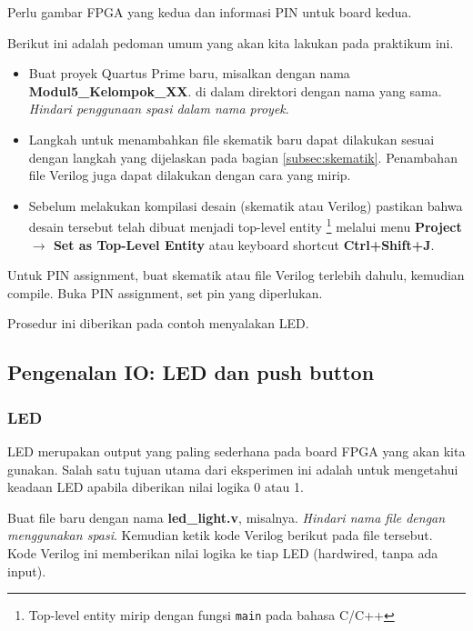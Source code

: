 \documentclass[a4paper,12pt,bahasa]{extarticle}
\begin{document}
{\color{red}Perlu gambar FPGA yang kedua dan informasi PIN untuk board kedua.}

Berikut ini adalah pedoman umum yang akan kita lakukan pada praktikum ini.

\begin{itemize}

\item Buat proyek Quartus Prime baru, misalkan dengan nama \textbf{Modul5\_Kelompok\_XX}.
di dalam direktori dengan nama yang sama. \textit{Hindari penggunaan
spasi dalam nama proyek}.

\item Langkah untuk menambahkan file skematik baru dapat dilakukan sesuai dengan langkah yang
dijelaskan pada bagian \ref{subsec:skematik}. Penambahan file Verilog
juga dapat dilakukan dengan cara yang mirip.

\item Sebelum melakukan kompilasi desain (skematik atau Verilog)
pastikan bahwa desain tersebut telah dibuat menjadi top-level entity
\footnote{Top-level entity mirip dengan fungsi \texttt{main} pada bahasa C/C++}
melalui menu \textbf{Project $\rightarrow$ Set as Top-Level Entity} atau
keyboard shortcut \textbf{Ctrl+Shift+J}.

\end{itemize}

Untuk PIN assignment, buat skematik atau file Verilog terlebih dahulu, kemudian compile.
Buka PIN assignment, set pin yang diperlukan.

Prosedur ini diberikan pada contoh menyalakan LED.

\subsection{Pengenalan IO: LED dan push button}

\subsubsection{LED}

LED merupakan output yang paling sederhana pada board FPGA yang akan
kita gunakan. Salah satu tujuan utama dari eksperimen ini adalah
untuk mengetahui keadaan LED apabila diberikan nilai logika 0 atau 1.

Buat file baru dengan nama \textbf{led\_light.v},
misalnya. \textit{Hindari nama file dengan menggunakan spasi}.
Kemudian ketik kode Verilog berikut pada file tersebut.
Kode Verilog ini memberikan nilai logika ke tiap
LED (hardwired, tanpa ada input).
\end{document}

